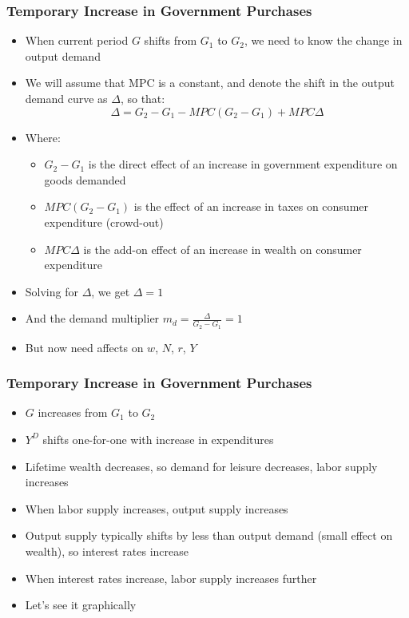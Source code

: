 \documentclass{beamer}
\begin{document}
\begin{frame}
\frametitle[alignment=center]{Temporary Increase in Government Purchases} 
\begin{itemize}
\item When current period $G$ shifts from $G_1$ to $G_2$, we need to know the change in output demand
\bigskip
\item We will assume that MPC is a constant, and denote the shift in the output demand curve as $\Delta$, so that:
$$\Delta=G_2-G_1-MPC(G_2-G_1)+MPC\Delta$$
\item Where:
\begin{itemize}
\item  $G_2-G_1$ is the direct effect of an increase in government expenditure on goods demanded
\item $MPC(G_2-G_1)$ is the effect of an increase in taxes on consumer expenditure (crowd-out)
\item $MPC\Delta$ is the add-on effect of an increase in wealth on consumer expenditure
\end{itemize}
\item Solving for $\Delta$, we get $\Delta=1$
\item And the demand multiplier $m_d=\frac{\Delta}{G_2-G_1}=1$
\item But now need affects on $w$, $N$, $r$, $Y$
\end{itemize}
\end{frame}

\begin{frame}
\frametitle[alignment=center]{Temporary Increase in Government Purchases} 
\begin{itemize}
\item $G$ increases from $G_1$ to $G_2$
\item $Y^D$ shifts one-for-one with increase in expenditures
\item Lifetime wealth decreases, so demand for leisure decreases, labor supply increases
\item When labor supply increases, output supply increases
\item Output supply typically shifts by less than output demand (small effect on wealth), so interest rates increase
\item When interest rates increase, labor supply increases further
\item Let's see it graphically
\end{itemize}
\end{frame}
\end{document}
